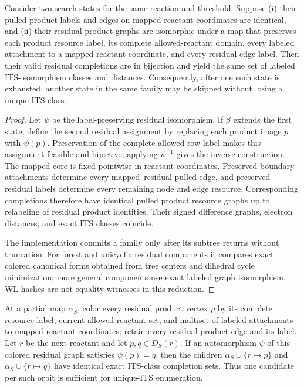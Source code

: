 \begin{proposition}
\label{prop:exact-residual-family}
Consider two search states for the same reaction and threshold.  Suppose
(i) their pulled product labels and edges on mapped reactant coordinates are
identical, and (ii) their residual product graphs are isomorphic under a map
that preserves each product resource label, its complete allowed-reactant
domain, every labeled attachment to a mapped reactant coordinate, and every
residual edge label.  Then their valid residual completions are in bijection
and yield the same set of labeled ITS-isomorphism classes and distances.
Consequently, after one such state is exhausted, another state in the same
family may be skipped without losing a unique ITS class.
\end{proposition}

\begin{proof}
Let $\psi$ be the label-preserving residual isomorphism.  If $\beta$ extends
the first state, define the second residual assignment by replacing each
product image $p$ with $\psi(p)$.  Preservation of the complete allowed-row
label makes this assignment feasible and bijective; applying $\psi^{-1}$
gives the inverse construction.  The mapped core is fixed pointwise in
reactant coordinates.  Preserved boundary attachments determine every
mapped--residual pulled edge, and preserved residual labels determine every
remaining node and edge resource.  Corresponding completions therefore have
identical pulled product resource graphs up to relabeling of residual product
identities.  Their signed difference graphs, electron distances, and exact
ITS classes coincide.

The implementation commits a family only after its subtree returns without
truncation.  For forest and unicyclic residual components it compares exact
colored canonical forms obtained from tree centers and dihedral cycle
minimization; more general components use exact labeled graph isomorphism.
WL hashes are not equality witnesses in this reduction.
\end{proof}

\begin{proposition}
\label{prop:dynamic-residual-orbits}
At a partial map $\alpha_S$, color every residual product vertex $p$ by its
complete resource label, current allowed-reactant set, and multiset of labeled
attachments to mapped reactant coordinates; retain every residual product
edge and its label.  Let $r$ be the next reactant and let $p,q\in D_S(r)$.
If an automorphism $\psi$ of this colored residual graph satisfies
$\psi(p)=q$, then the children $\alpha_S\cup\{r\mapsto p\}$ and
$\alpha_S\cup\{r\mapsto q\}$ have identical exact ITS-class completion sets.
Thus one candidate per such orbit is sufficient for unique-ITS enumeration.
\end{proposition}

